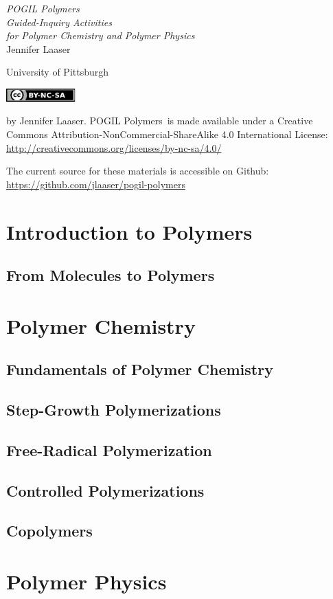 \documentclass[letter,11pt,onecolumn]{memoir}
\date{\today}
\newcommand{\thetitle}{POGIL Polymers}
\newcommand*{\titlepage}{\begingroup%
\raggedleft
\vspace*{\baselineskip}
{\Huge\itshape POGIL Polymers}\\[\baselineskip]
{\large\itshape Guided-Inquiry Activities \\for Polymer Chemistry and Polymer Physics}\\[0.2\textheight]
{\Large Jennifer Laaser}\par
\vfill
{\Large  University of Pittsburgh}
\vspace*{\baselineskip}
\endgroup}
\newcommand*{\copyrightpage}{\begingroup
\makeatother
\vspace*{5in}
\includegraphics[width=0.2\textwidth]{by-nc-sa}

\vspace{0.2in}
	\begin{minipage}{0.75\textwidth}
		\textcopyright 2018 by Jennifer Laaser. \thetitle\ is made available under a Creative Commons Attribution-NonCommercial-ShareAlike 4.0 International License: \url{http://creativecommons.org/licenses/by-nc-sa/4.0/}

		\vspace{0.1in}

		The current source for these materials is accessible on Github:\\ 		\url{https://github.com/jlaaser/pogil-polymers}
	\end{minipage}
\vfill
\endgroup}
\begin{document}
\frontmatter
\pagestyle{empty}
\titlepage
\clearpage

\copyrightpage
\clearpage

\tableofcontents*
\clearpage



\mainmatter

\part{Introduction to Polymers}

	\chapter{From Molecules to Polymers}
		

\part{Polymer Chemistry}

	\chapter{Fundamentals of Polymer Chemistry}

	\chapter{Step-Growth Polymerizations}

	\chapter{Free-Radical Polymerization}

	\chapter{Controlled Polymerizations}

	\chapter{Copolymers}

\part{Polymer Physics}
\end{document}
